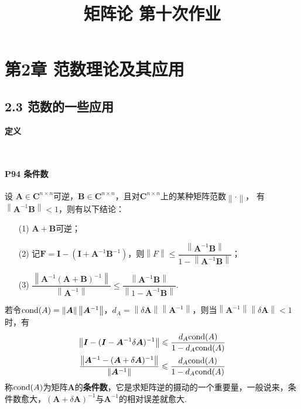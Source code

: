 \documentclass[12pt, a4paper, oneside, fontset=none]{ctexart}
\author{}
\date{}
\title{\vspace{-3em}\textbf{矩阵论 \quad 第十次作业}\vspace{-3em}}
\begin{document}
\maketitle

\section*{第2章 \quad 范数理论及其应用}

\subsection*{2.3 \quad 范数的一些应用}

\centerline{\large{\textbf{定义}}} \ \par

\paragraph*{P94 条件数} 设 $\bm{A} \in \bm{C}^{n\times n}$可逆，$\bm{B} \in \bm{C}^{n\times n}$，且对$\bm{C}^{n\times n}$上的某种矩阵范数$\left\lVert \bm{\cdot} \right\rVert $，
有$\left\lVert \bm{A}^{-1}\bm{B} \right\rVert < 1$，则有以下结论：
\begin{enumerate}
    \item[(1)] $\bm{A} + \bm{B}$可逆；
    \item[(2)] 记$\bm{F} = \bm{I} - (\bm{I} + \bm{A}^{-1}\bm{B}^{-1})$，则$\left\lVert F \right\rVert \leqslant \dfrac{\left\lVert \bm{A}^{-1}\bm{B} \right\rVert}{1 -\left\lVert \bm{A}^{-1}\bm{B} \right\rVert}$；
    \item[(3)] $\dfrac{\left\lVert \bm{A}^{-1} (\bm{A} + \bm{B})^{-1} \right\rVert}{\left\lVert \bm{A}^{-1} \right\rVert} \leqslant \dfrac{\left\lVert \bm{A}^{-1}\bm{B} \right\rVert}{\left\lVert 1 - \bm{A}^{-1}\bm{B} \right\rVert}$.
\end{enumerate}
若令${\rm cond} (A) = \left\lVert \bm{A} \right\rVert \left\lVert \bm{A}^{-1} \right\rVert$，$d_A = \left\lVert \delta\bm{A} \right\rVert\left\lVert \bm{A}^{-1} \right\rVert$，则当$\left\lVert \bm{A}^{-1} \right\rVert\left\lVert \delta\bm{A} \right\rVert < 1$时，有
\begin{gather*}
    \left\lVert \bm{I} - (\bm{I} - \bm{A}^{-1}\delta \bm{A})^{-1} \right\rVert \leqslant \dfrac{d_A {\rm cond}(A)}{1 - d_A {\rm cond}(A)} \\
    \dfrac{\left\lVert \bm{A}^{-1} - (\bm{A} + \delta \bm{A})^{-1} \right\rVert}{\left\lVert \bm{A}^{-1} \right\rVert} \leqslant \dfrac{d_A {\rm cond}(A)}{1 - d_A {\rm cond}(A)}
\end{gather*}
称${\rm cond}(A)$为矩阵$\bm{A}$的\textbf{条件数}，它是求矩阵逆的摄动的一个重要量，一般说来，条件数愈大，$(\bm{A} + \delta\bm{A})^{-1}$与$\bm{A}^{-1}$的相对误差就愈大.
\end{document}
